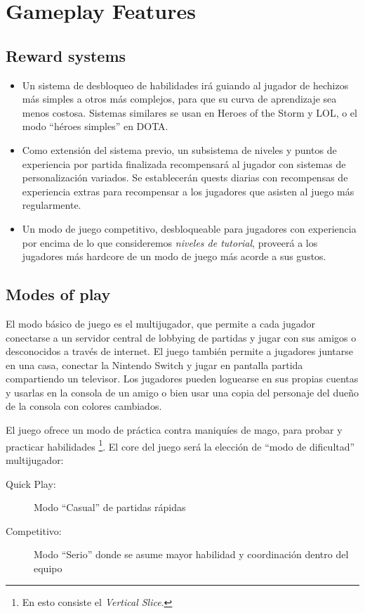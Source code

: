 \documentclass[12pt]{report}
\begin{document}
\section{Gameplay Features}     

\subsection{Reward systems}

\begin{itemize}
\item Un sistema de desbloqueo de habilidades irá guiando al jugador de hechizos más simples a otros más complejos, para que su curva de aprendizaje sea menos costosa. Sistemas similares se usan en Heroes of the Storm y LOL, o el modo ``héroes simples'' en DOTA.
\item Como extensión del sistema previo, un subsistema de niveles y puntos de experiencia por partida finalizada recompensará al jugador con sistemas de personalización variados. Se establecerán quests diarias con recompensas de experiencia extras para recompensar a los jugadores que asisten al juego más regularmente.
\item Un modo de juego competitivo, desbloqueable para jugadores con experiencia por encima de lo que consideremos \textit{niveles de tutorial}, proveerá a los jugadores más hardcore de un modo de juego más acorde a sus gustos.
\end{itemize}     

\subsection{Modes of play}

El modo básico de juego es el multijugador, que permite a cada jugador conectarse a un servidor central de lobbying de partidas y jugar con sus amigos o desconocidos a través de internet. El juego también permite a jugadores juntarse en una casa, conectar la Nintendo Switch y jugar en pantalla partida compartiendo un televisor. Los jugadores pueden loguearse en sus propias cuentas y usarlas en la consola de un amigo o bien usar una copia del personaje del dueño de la consola con colores cambiados.

El juego ofrece un modo de práctica contra maniquíes de mago, para probar y practicar habilidades \footnote{En esto consiste el \textit{Vertical Slice}.}. El core del juego será la elección de ``modo de dificultad'' multijugador:

\begin{description}
\item[Quick Play:] Modo ``Casual'' de partidas rápidas
\item[Competitivo:] Modo ``Serio'' donde se asume mayor habilidad y coordinación dentro del equipo
\end{description}
\end{document}
